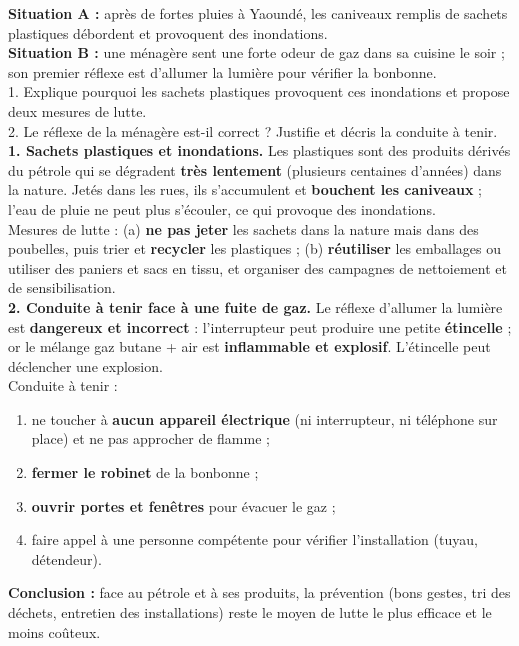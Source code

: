 \documentclass[11pt]{article}
\begin{document}
\begin{exoresolu}
\textbf{Situation A :} après de fortes pluies à Yaoundé, les caniveaux remplis de sachets plastiques débordent et provoquent des inondations. \\
\textbf{Situation B :} une ménagère sent une forte odeur de gaz dans sa cuisine le soir ; son premier réflexe est d'allumer la lumière pour vérifier la bonbonne. \\
1. Explique pourquoi les sachets plastiques provoquent ces inondations et propose deux mesures de lutte. \\
2. Le réflexe de la ménagère est-il correct ? Justifie et décris la conduite à tenir.
\tcblower
\textbf{1. Sachets plastiques et inondations.} Les plastiques sont des produits dérivés du pétrole qui se dégradent \textbf{très lentement} (plusieurs centaines d'années) dans la nature. Jetés dans les rues, ils s'accumulent et \textbf{bouchent les caniveaux} ; l'eau de pluie ne peut plus s'écouler, ce qui provoque des inondations. \\
Mesures de lutte : (a) \textbf{ne pas jeter} les sachets dans la nature mais dans des poubelles, puis trier et \textbf{recycler} les plastiques ; (b) \textbf{réutiliser} les emballages ou utiliser des paniers et sacs en tissu, et organiser des campagnes de nettoiement et de sensibilisation. \\
\textbf{2. Conduite à tenir face à une fuite de gaz.} Le réflexe d'allumer la lumière est \textbf{dangereux et incorrect} : l'interrupteur peut produire une petite \textbf{étincelle} ; or le mélange gaz butane + air est \textbf{inflammable et explosif}. L'étincelle peut déclencher une explosion. \\
Conduite à tenir :
\begin{enumerate}
\item ne toucher à \textbf{aucun appareil électrique} (ni interrupteur, ni téléphone sur place) et ne pas approcher de flamme ;
\item \textbf{fermer le robinet} de la bonbonne ;
\item \textbf{ouvrir portes et fenêtres} pour évacuer le gaz ;
\item faire appel à une personne compétente pour vérifier l'installation (tuyau, détendeur).
\end{enumerate}
\textbf{Conclusion :} face au pétrole et à ses produits, la prévention (bons gestes, tri des déchets, entretien des installations) reste le moyen de lutte le plus efficace et le moins coûteux.
\end{exoresolu}
\end{document}
